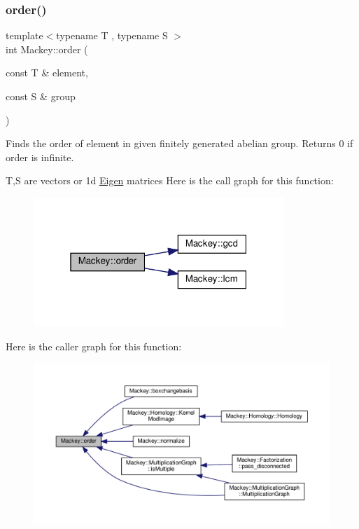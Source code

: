 \mbox{\label{namespaceMackey_a4abdca157edcf425b1e7ceff39d74c2f}} 
\subsubsection{\texorpdfstring{order()}{order()}}
{\footnotesize\ttfamily template$<$typename T , typename S $>$ \\
int Mackey\+::order (\begin{DoxyParamCaption}\item[{const T \&}]{element,  }\item[{const S \&}]{group }\end{DoxyParamCaption})}



Finds the order of element in given finitely generated abelian group. Returns 0 if order is infinite. 

T,S are vectors or 1d \hyperlink{namespaceEigen}{Eigen} matrices Here is the call graph for this function\+:\nopagebreak
\begin{figure}[H]
\begin{center}
\leavevmode
\includegraphics[width=268pt]{namespaceMackey_a4abdca157edcf425b1e7ceff39d74c2f_cgraph}
\end{center}
\end{figure}
Here is the caller graph for this function\+:\nopagebreak
\begin{figure}[H]
\begin{center}
\leavevmode
\includegraphics[width=350pt]{namespaceMackey_a4abdca157edcf425b1e7ceff39d74c2f_icgraph}
\end{center}
\end{figure}
\mbox{\label{namespaceMackey_ae54ebc8588d873a744541394ac5113f0}} 
